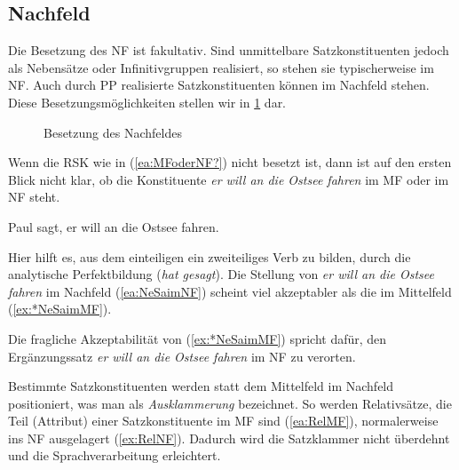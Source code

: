 \subsection{Nachfeld}\label{subsection:Nachfeld}

Die Besetzung des NF ist fakultativ. Sind unmittelbare Satzkonstituenten jedoch als Nebensätze oder Infinitivgruppen realisiert, so stehen sie typischerweise im NF. Auch durch PP realisierte Satzkonstituenten können im Nachfeld stehen. Diese Besetzungsmöglichkeiten stellen wir in \ref{fig:Nachfeld} dar.


\begin{figure}[!htbp]
  \centering
  \caption{Besetzung des Nachfeldes}
  \label{fig:Nachfeld}
\end{figure}

Wenn die RSK wie in (\ref{ea:MFoderNF?}) nicht besetzt ist, dann ist auf den ersten Blick nicht klar, ob die Konstituente \textit{er will an die Ostsee fahren} im MF oder im NF steht.

\ea \label{ea:MFoderNF?} Paul sagt, er will an die Ostsee fahren.
\z 

Hier hilft es, aus dem einteiligen ein zweiteiliges Verb zu bilden, \zB durch die analytische Perfektbildung (\textit{hat gesagt}). Die Stellung von \textit{er will an die Ostsee fahren} im Nachfeld (\ref{ea:NeSaimNF}) scheint viel akzeptabler als die im Mittelfeld (\ref{ex:*NeSaimMF}).  

\newpage
\ea \label{ea:TestMFoderNF}
\label{ea:NeSaimNF}
\label{ex:*NeSaimMF}
\z 
\z 

Die fragliche Akzeptabilität von (\ref{ex:*NeSaimMF}) spricht dafür, den Ergänzungssatz \textit{er will an die Ostsee fahren} im NF zu verorten. 

Bestimmte Satzkonstituenten werden statt dem Mittelfeld im Nachfeld positioniert, was man als \textit{Ausklammerung} bezeichnet. So werden Relativsätze, die Teil (Attribut) einer Satzkonstituente im MF sind (\ref{ea:RelMF}), normalerweise ins NF ausgelagert (\ref{ex:RelNF}). Dadurch wird die Satzklammer nicht überdehnt und die Sprachverarbeitung erleichtert. 

